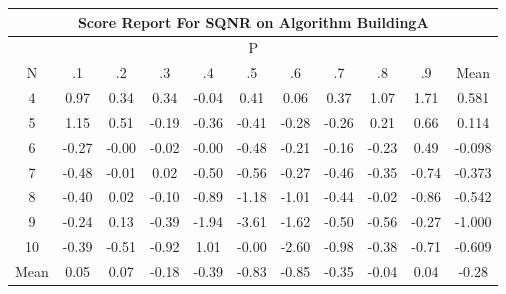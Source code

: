 \documentclass[11pt,a4paper]{report}
\begin{document}
\begin{longtable}{ | c || c | c | c | c | c | c | c | c | c || c |}
\hline
\multicolumn{11}{|c|}{ Score Report For SQNR on Algorithm BuildingA} \\
\hline
\multicolumn{11}{|c|}{ P } \\
\hline
N & .1 & .2 & .3 & .4 & .5 & .6 & .7 & .8 & .9 & Mean\\
 \hline
 \hline
 \endhead
  4 &  \cellcolor[HTML]{E7E7FF} 0.97 &  \cellcolor[HTML]{F7F7FF} 0.34 &  \cellcolor[HTML]{F7F7FF} 0.34 &  \cellcolor[HTML]{FFFFFF} -0.04 &  \cellcolor[HTML]{F7F7FF} 0.41 &  \cellcolor[HTML]{FFFFFF} 0.06 &  \cellcolor[HTML]{F7F7FF} 0.37 &  \cellcolor[HTML]{E7E7FF} 1.07 &  \cellcolor[HTML]{D7D7FF} 1.71 & 0.581 \\
  5 &  \cellcolor[HTML]{DFDFFF} 1.15 &  \cellcolor[HTML]{EFEFFF} 0.51 &  \cellcolor[HTML]{FFF7F7} -0.19 &  \cellcolor[HTML]{FFF7F7} -0.36 &  \cellcolor[HTML]{FFF7F7} -0.41 &  \cellcolor[HTML]{FFF7F7} -0.28 &  \cellcolor[HTML]{FFF7F7} -0.26 &  \cellcolor[HTML]{F7F7FF} 0.21 &  \cellcolor[HTML]{EFEFFF} 0.66 & 0.114 \\
  6 &  \cellcolor[HTML]{FFF7F7} -0.27 &  \cellcolor[HTML]{FFFFFF} -0.00 &  \cellcolor[HTML]{FFFFFF} -0.02 &  \cellcolor[HTML]{FFFFFF} -0.00 &  \cellcolor[HTML]{FFEFEF} -0.48 &  \cellcolor[HTML]{FFF7F7} -0.21 &  \cellcolor[HTML]{FFF7F7} -0.16 &  \cellcolor[HTML]{FFF7F7} -0.23 &  \cellcolor[HTML]{EFEFFF} 0.49 & -0.098 \\
  7 &  \cellcolor[HTML]{FFEFEF} -0.48 &  \cellcolor[HTML]{FFFFFF} -0.01 &  \cellcolor[HTML]{FFFFFF} 0.02 &  \cellcolor[HTML]{FFEFEF} -0.50 &  \cellcolor[HTML]{FFEFEF} -0.56 &  \cellcolor[HTML]{FFF7F7} -0.27 &  \cellcolor[HTML]{FFF7F7} -0.46 &  \cellcolor[HTML]{FFF7F7} -0.35 &  \cellcolor[HTML]{FFEFEF} -0.74 & -0.373 \\
  8 &  \cellcolor[HTML]{FFF7F7} -0.40 &  \cellcolor[HTML]{FFFFFF} 0.02 &  \cellcolor[HTML]{FFFFFF} -0.10 &  \cellcolor[HTML]{FFE7E7} -0.89 &  \cellcolor[HTML]{FFDFDF} -1.18 &  \cellcolor[HTML]{FFE7E7} -1.01 &  \cellcolor[HTML]{FFF7F7} -0.44 &  \cellcolor[HTML]{FFFFFF} -0.02 &  \cellcolor[HTML]{FFE7E7} -0.86 & -0.542 \\
  9 &  \cellcolor[HTML]{FFF7F7} -0.24 &  \cellcolor[HTML]{FFFFFF} 0.13 &  \cellcolor[HTML]{FFF7F7} -0.39 &  \cellcolor[HTML]{FFCFCF} -1.94 &  \cellcolor[HTML]{FFA7A7} -3.61 &  \cellcolor[HTML]{FFD7D7} -1.62 &  \cellcolor[HTML]{FFEFEF} -0.50 &  \cellcolor[HTML]{FFEFEF} -0.56 &  \cellcolor[HTML]{FFF7F7} -0.27 & -1.000 \\
  10 &  \cellcolor[HTML]{FFF7F7} -0.39 &  \cellcolor[HTML]{FFEFEF} -0.51 &  \cellcolor[HTML]{FFE7E7} -0.92 &  \cellcolor[HTML]{E7E7FF} 1.01 &  \cellcolor[HTML]{FFFFFF} -0.00 &  \cellcolor[HTML]{FFBFBF} -2.60 &  \cellcolor[HTML]{FFE7E7} -0.98 &  \cellcolor[HTML]{FFF7F7} -0.38 &  \cellcolor[HTML]{FFEFEF} -0.71 & -0.609 \\
 \hline
 \hline
Mean &  \cellcolor[HTML]{FFFFFF} 0.05 &  \cellcolor[HTML]{FFFFFF} 0.07 &  \cellcolor[HTML]{FFF7F7} -0.18 &  \cellcolor[HTML]{FFF7F7} -0.39 &  \cellcolor[HTML]{FFE7E7} -0.83 &  \cellcolor[HTML]{FFE7E7} -0.85 &  \cellcolor[HTML]{FFF7F7} -0.35 &  \cellcolor[HTML]{FFFFFF} -0.04 &  \cellcolor[HTML]{FFFFFF} 0.04 &  \cellcolor[HTML]{FFF7F7} -0.28
\end{longtable}
\end{document}
